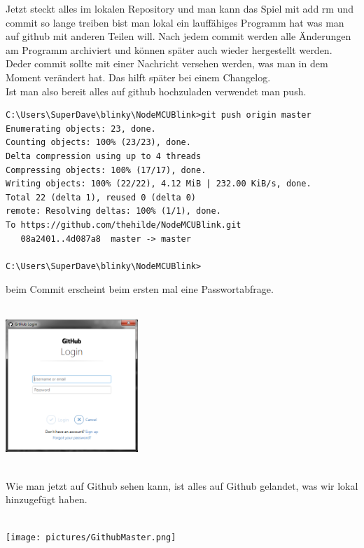 Jetzt steckt alles im lokalen Repository und man kann das Spiel mit add rm und commit so lange treiben bist man lokal ein lauffähiges Programm hat was man auf github mit anderen Teilen will. Nach jedem commit  werden alle Änderungen am Programm archiviert und können später auch wieder hergestellt werden. Deder commit sollte mit einer Nachricht versehen werden, was man in dem Moment verändert hat. Das hilft später bei einem Changelog.\\
Ist man also bereit alles auf github hochzuladen verwendet man push.\\
\begin{verbatim}
C:\Users\SuperDave\blinky\NodeMCUBlink>git push origin master
Enumerating objects: 23, done.
Counting objects: 100% (23/23), done.
Delta compression using up to 4 threads
Compressing objects: 100% (17/17), done.
Writing objects: 100% (22/22), 4.12 MiB | 232.00 KiB/s, done.
Total 22 (delta 1), reused 0 (delta 0)
remote: Resolving deltas: 100% (1/1), done.
To https://github.com/thehilde/NodeMCUBlink.git
   08a2401..4d087a8  master -> master

C:\Users\SuperDave\blinky\NodeMCUBlink>
\end{verbatim}
beim Commit erscheint beim ersten mal eine Passwortabfrage.\\
\ \\
\begin{minipage}[t]{\textwidth}
  \centering
  \includegraphics[height=5cm]{pictures/GithubPush.png}
  \label{img:GithubPush}
  \end{minipage}
\ \\
Wie man jetzt auf Github sehen kann, ist alles auf Github gelandet, was wir lokal hinzugefügt haben.\\
\ \\
\begin{minipage}[t]{\textwidth}
  \centering
  \texttt{[image: pictures/GithubMaster.png]}
  \label{img:GithubMaster}
  \end{minipage}  




